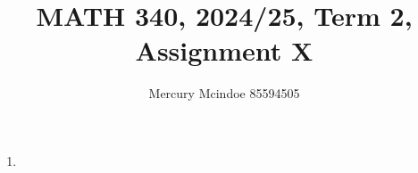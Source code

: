 \documentclass[11pt]{article}
\title{MATH 340, 2024/25, Term 2, Assignment X}
\author{Mercury Mcindoe 85594505}
\begin{document}
\maketitle 
\thispagestyle{empty}

\begin{enumerate}
  \item
\end{enumerate}
\end{document}
